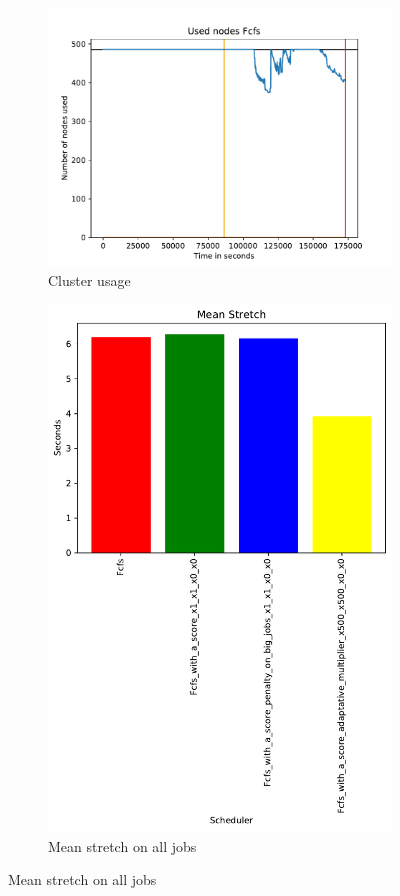 \documentclass[a4paper]{article}
\begin{document}
\begin{figure}[H]\centering
\begin{subfigure}[b]{0.4\linewidth}\centering\includegraphics[width=0.9\linewidth]{MBSS/plot/2022-01-21->2022-01-21_V9271_Fcfs_Used_nodes_450_128_32_256_4_1024.pdf}\caption{Cluster usage}\label{45}\end{subfigure}
\begin{subfigure}[b]{0.4\linewidth}\centering\includegraphics[width=0.9\linewidth]{MBSS/plot/Results_FCFS_Score_Adaptative_Multiplier_2022-01-21->2022-01-21_V9271_Mean_Stretch_450_128_32_256_4_1024.pdf}\caption{Mean stretch on all jobs}\label{45}\end{subfigure}

\end{figure}
\end{document}
